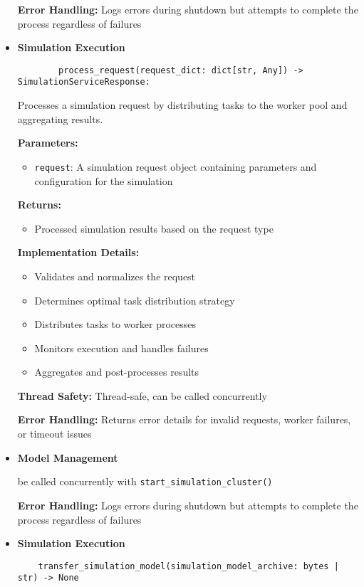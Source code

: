 \begin{itemize}
	\textbf{Error Handling:} Logs errors during shutdown but attempts to complete the process regardless of failures

	\item \textbf{Simulation Execution}
	\begin{verbatim}
		process_request(request_dict: dict[str, Any]) -> SimulationServiceResponse:
	\end{verbatim}

	Processes a simulation request by distributing tasks to the worker pool and aggregating results.

	\textbf{Parameters:}
	\begin{itemize}
		\item \texttt{request}: A simulation request object containing parameters and configuration for the simulation
	\end{itemize}

	\textbf{Returns:}
	\begin{itemize}
		\item Processed simulation results based on the request type
	\end{itemize}

	\textbf{Implementation Details:}
	\begin{itemize}
		\item Validates and normalizes the request
		\item Determines optimal task distribution strategy
		\item Distributes tasks to worker processes
		\item Monitors execution and handles failures
		\item Aggregates and post-processes results
	\end{itemize}

	\textbf{Thread Safety:} Thread-safe, can be called concurrently

	\textbf{Error Handling:} Returns error details for invalid requests, worker failures, or timeout issues

	\item \textbf{Model Management}

be called concurrently with \texttt{start\_simulation\_cluster()}

\textbf{Error Handling:} Logs errors during shutdown but attempts to complete the process regardless of failures

\item \textbf{Simulation Execution}

\begin{verbatim}
	transfer_simulation_model(simulation_model_archive: bytes | str) -> None
\end{verbatim}


\end{itemize}
